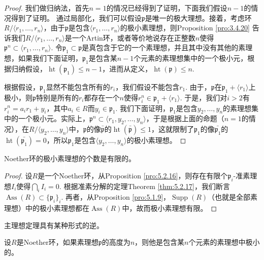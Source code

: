 \begin{proof}
我们做归纳法，首先$n=1$的情况已经得到了证明，下面我们假设$n-1$的情况得到了证明。
通过局部化，我们可以假设$\mathfrak p$是唯一的极大理想。接着，考虑环$R/\langle r_1,\dots,r_n\rangle$，由于$\mathfrak p$是包含$\langle r_1,\dots,r_n\rangle$的极小素理想，则Proposition \ref{pro:3.4.20} 告诉我们$R/\langle r_1,\dots,r_n\rangle$是一个Artin环，或者等价地说存在正整数$n$使得$\mathfrak p^n\subset \langle r_1,\dots,r_n\rangle$. 令$\mathfrak p_1\subset \mathfrak p$是真包含于它的一个素理想，并且其中没有其他的素理想，如果我们下面证明，$\mathfrak p_1$是包含某$n-1$个元素的素理想集中的一个极小元，根据归纳假设，$\operatorname{ht}(\mathfrak p_1)\leq n-1$，进而从定义，$\operatorname{ht}(\mathfrak p)\leq n$.

根据假设，$\mathfrak p_1$显然不能包含所有的$r_i$，我们假设不能包含$r_1$. 由于，$\mathfrak p$在$\mathfrak p_1+\langle r_1\rangle$上极小，则$\mathfrak p$特别是所有的$r_i$都存在一个$n$使得$r_i^n\in \mathfrak p_1+\langle r_1\rangle$. 于是，我们对$i>2$有$r_i^n=a_ir_1+y_i$，其中$a_i\in R$而$y_i\in \mathfrak p_1$. 我们下面证明，$\mathfrak p_1$是包含$y_2,\dots,y_n$的素理想集中的一个极小元。实际上，$\mathfrak p^n\subset \langle r_1,y_2,\dots,y_n\rangle$，于是根据上面的命题（$n=1$的情况），在$R/\langle y_2,\dots,y_n\rangle$中，$\mathfrak p$的像$\bar{\mathfrak p}$的$\operatorname{ht}(\bar{\mathfrak p}) \leq 1$，这就限制了$\mathfrak p_1$的像$\bar{\mathfrak p_1}$的$\operatorname{ht}(\bar{\mathfrak p_1})=0$，所以$\mathfrak p_1$是包含$\langle y_2,\dots,y_n\rangle$的极小素理想。
\end{proof}

\begin{lem}
	Noether环的极小素理想的个数是有限的。
\end{lem}

\begin{proof}
	设$R$是一个Noether环，从Proposition \ref{pro:5.2.16}，则存在有限个$\mathfrak p_i$-准素理想$I_i$使得$\bigcap_i I_i=0$. 根据准素分解的定理Theorem \ref{thm:5.2.17}，我们断言$\operatorname{Ass}(R)\subset \{\mathfrak p_i\}_i$. 再者，从Proposition \ref{pro:5.1.9}，$\operatorname{Supp}(R)$（也就是全部素理想）中的极小素理想都在$\operatorname{Ass}(R)$中，故而极小素理想有限。
\end{proof}

主理想定理具有某种形式的逆。

\begin{pro}
	设$R$是Noether环，如果素理想$\mathfrak p$的高度为$n$，则他是包含某$n$个元素的素理想中极小的。
\end{pro}

